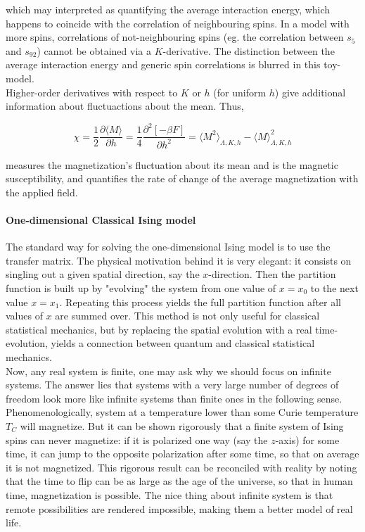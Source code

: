 \documentclass{homework}
\begin{document}
which may interpreted as quantifying the average interaction energy, which happens to coincide with the correlation of neighbouring spins. In a model with more spins, correlations of not-neighbouring spins (eg. the correlation between $s_5$ and $s_{92}$) cannot be obtained via a $K$-derivative. The distinction between the average interaction energy and generic spin correlations is blurred in this toy-model. \\

Higher-order derivatives with respect to $K$ or $h$ (for uniform $h$) give additional information about fluctuactions about the mean. Thus, 

\begin{equation}
    \chi = \frac{1}{2} \frac{ \partial \langle M \rangle}{\partial h} = \frac{1}{4} \frac{\partial^2 [-\beta F]}{\partial h^2} = \langle M^2 \rangle_{\Lambda, K, h}- \langle M \rangle^2_{\Lambda, K, h}
\end{equation}

measures the magnetization's fluctuation about its mean and is the magnetic susceptibility, and quantifies the rate of change of the average magnetization with the applied field. \\

\paragraph{\textbf{One-dimensional Classical Ising model}}

The standard way for solving the one-dimensional Ising model is to use the transfer matrix. The physical motivation behind it is very elegant: it consists on singling out a given spatial direction, say the $x$-direction. Then the partition function is built up by "evolving" the system from one value of $x=x_0$ to the next value $x=x_1$. Repeating this process yields the full partition function after all values of $x$ are summed over. This method is not only useful for classical statistical mechanics, but by replacing the spatial evolution with a real time-evolution, yields a connection between quantum and classical statistical mechanics. \\

Now, any real system is finite, one may ask why we should focus on infinite systems. The answer lies that systems with a very large number of degrees of freedom look more like infinite systems than finite ones in the following sense.  Phenomenologically, system at a temperature lower than some Curie temperature $T_C$ will magnetize. But it can be shown rigorously that a finite system of Ising spins can never magnetize: if it is polarized one way (say the $z$-axis) for some time, it can jump to the opposite polarization after some time, so that on average it is not magnetized. This rigorous result can be reconciled with reality by noting that the time to flip can be as large as the age of the universe, so that in human time, magnetization is possible. The nice thing about infinite system is that remote possibilities are rendered impossible, making them a better model of real life. \\
\end{document}

